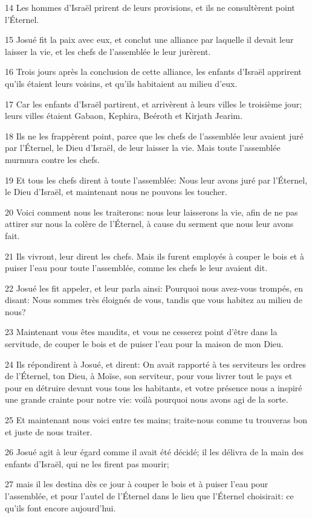 \par 14 Les hommes d'Israël prirent de leurs provisions, et ils ne consultèrent point l'Éternel.
\par 15 Josué fit la paix avec eux, et conclut une alliance par laquelle il devait leur laisser la vie, et les chefs de l'assemblée le leur jurèrent.
\par 16 Trois jours après la conclusion de cette alliance, les enfants d'Israël apprirent qu'ils étaient leurs voisins, et qu'ils habitaient au milieu d'eux.
\par 17 Car les enfants d'Israël partirent, et arrivèrent à leurs villes le troisième jour; leurs villes étaient Gabaon, Kephira, Beéroth et Kirjath Jearim.
\par 18 Ils ne les frappèrent point, parce que les chefs de l'assemblée leur avaient juré par l'Éternel, le Dieu d'Israël, de leur laisser la vie. Mais toute l'assemblée murmura contre les chefs.
\par 19 Et tous les chefs dirent à toute l'assemblée: Nous leur avons juré par l'Éternel, le Dieu d'Israël, et maintenant nous ne pouvons les toucher.
\par 20 Voici comment nous les traiterons: nous leur laisserons la vie, afin de ne pas attirer sur nous la colère de l'Éternel, à cause du serment que nous leur avons fait.
\par 21 Ils vivront, leur dirent les chefs. Mais ils furent employés à couper le bois et à puiser l'eau pour toute l'assemblée, comme les chefs le leur avaient dit.
\par 22 Josué les fit appeler, et leur parla ainsi: Pourquoi nous avez-vous trompés, en disant: Nous sommes très éloignés de vous, tandis que vous habitez au milieu de nous?
\par 23 Maintenant vous êtes maudits, et vous ne cesserez point d'être dans la servitude, de couper le bois et de puiser l'eau pour la maison de mon Dieu.
\par 24 Ils répondirent à Josué, et dirent: On avait rapporté à tes serviteurs les ordres de l'Éternel, ton Dieu, à Moïse, son serviteur, pour vous livrer tout le pays et pour en détruire devant vous tous les habitants, et votre présence nous a inspiré une grande crainte pour notre vie: voilà pourquoi nous avons agi de la sorte.
\par 25 Et maintenant nous voici entre tes mains; traite-nous comme tu trouveras bon et juste de nous traiter.
\par 26 Josué agit à leur égard comme il avait été décidé; il les délivra de la main des enfants d'Israël, qui ne les firent pas mourir;
\par 27 mais il les destina dès ce jour à couper le bois et à puiser l'eau pour l'assemblée, et pour l'autel de l'Éternel dans le lieu que l'Éternel choisirait: ce qu'ils font encore aujourd'hui.

